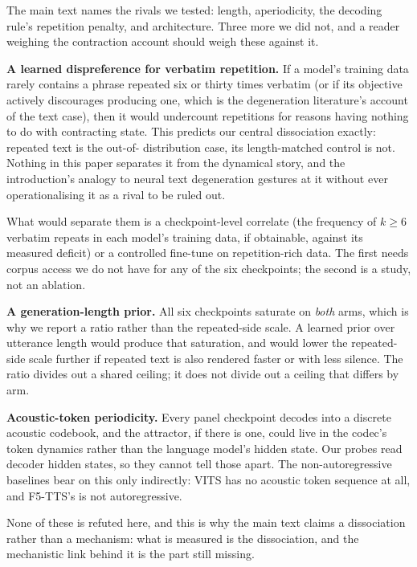 \documentclass[11pt]{article}
\begin{document}
The main text names the rivals we tested: length, aperiodicity, the decoding
rule's repetition penalty, and architecture. Three more we did not, and a reader
weighing the contraction account should weigh these against it.

\noindent\textbf{A learned dispreference for verbatim repetition.} If a model's
training data rarely contains a phrase repeated six or thirty times verbatim
(or if its objective actively discourages producing one, which is the
degeneration literature's account of the text case), then it would undercount
repetitions for reasons having nothing to do with contracting state. This
predicts our central dissociation exactly: repeated text is the out-of-
distribution case, its length-matched control is not. Nothing in this paper
separates it from the dynamical story, and the introduction's analogy to neural
text degeneration gestures at it without ever operationalising it as a rival to
be ruled out.

What would separate them is a checkpoint-level correlate (the frequency of
$k\ge6$ verbatim repeats in each model's training data, if obtainable, against
its measured deficit) or a controlled fine-tune on repetition-rich data. The
first needs corpus access we do not have for any of the six checkpoints; the
second is a study, not an ablation.

\noindent\textbf{A generation-length prior.} All six checkpoints saturate on
\emph{both} arms, which is why we report a ratio rather than the repeated-side
scale. A learned prior over utterance length would produce that saturation, and
would lower the repeated-side scale further if repeated text is also rendered
faster or with less silence. The ratio divides out a shared ceiling; it does not
divide out a ceiling that differs by arm.

\noindent\textbf{Acoustic-token periodicity.} Every panel checkpoint decodes into
a discrete acoustic codebook, and the attractor, if there is one, could live in
the codec's token dynamics rather than the language model's hidden state. Our
probes read decoder hidden states, so they cannot tell those apart. The
non-autoregressive baselines bear on this only indirectly: VITS has no acoustic
token sequence at all, and F5-TTS's is not autoregressive.

None of these is refuted here, and this is why the main text claims a
dissociation rather than a mechanism: what is measured is the dissociation, and
the mechanistic link behind it is the part still missing.
\end{document}
